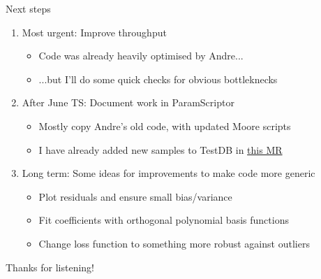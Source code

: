 \documentclass[xcolor={dvipsnames}]{beamer}
\begin{document}
\begin{frame}{Next steps}
  \vspace{0.0cm}
  \begin{enumerate}
    \setlength\itemsep{1.8em}
    \item{Most urgent: Improve throughput}
    \begin{itemize}
      \item{Code was already heavily optimised by Andre...}
      \item{...but I'll do some quick checks for obvious bottleknecks}
    \end{itemize}
    \item{After June TS: Document work in ParamScriptor}
    \begin{itemize}
      \item{Mostly copy Andre's old code, with updated Moore scripts}
      \item{I have already added new samples to TestDB in \href{https://gitlab.cern.ch/lhcb-datapkg/PRConfig/-/merge_requests/567}{this MR}}
    \end{itemize}
    \item{Long term: Some ideas for improvements to make code more generic}
    \begin{itemize}
      \item{Plot residuals and ensure small bias/variance}
      \item{Fit coefficients with orthogonal polynomial basis functions}
      \item{Change loss function to something more robust against outliers}
    \end{itemize}
  \end{enumerate}
  \begin{center}
    \Huge Thanks for listening!
  \end{center}
\end{frame}
\end{document}
